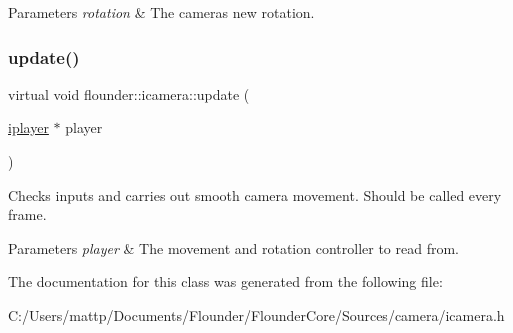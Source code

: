 \begin{DoxyParams}{Parameters}
{\em rotation} & The cameras new rotation. \\
\hline
\end{DoxyParams}
\mbox{\label{classflounder_1_1icamera_ac7dc04e6fed5a9269c3d6ef11807fe99}} 
\subsubsection{\texorpdfstring{update()}{update()}}
{\footnotesize\ttfamily virtual void flounder\+::icamera\+::update (\begin{DoxyParamCaption}\item[{\hyperlink{classflounder_1_1iplayer}{iplayer} $\ast$}]{player }\end{DoxyParamCaption})\hspace{0.3cm}{\ttfamily [pure virtual]}}



Checks inputs and carries out smooth camera movement. Should be called every frame. 


\begin{DoxyParams}{Parameters}
{\em player} & The movement and rotation controller to read from. \\
\hline
\end{DoxyParams}


The documentation for this class was generated from the following file\+:\begin{DoxyCompactItemize}
\item 
C\+:/\+Users/mattp/\+Documents/\+Flounder/\+Flounder\+Core/\+Sources/camera/icamera.\+h\end{DoxyCompactItemize}
